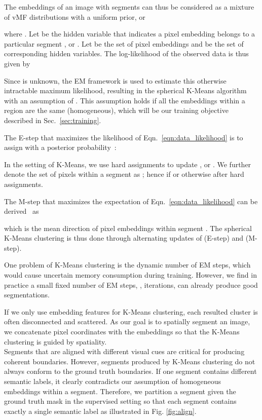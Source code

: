 \documentclass[10pt,twocolumn,letterpaper]{article}
\begin{document}
The embeddings of an image with  segments can thus be considered as a mixture of  vMF distributions with a uniform prior, or

where . Let  be the hidden variable that indicates a pixel embedding  belongs to a particular segment , or . Let  be the set of pixel embeddings and  be the set of corresponding hidden variables. The log-likelihood of the observed data is thus given by

Since  is unknown, the EM framework is used to estimate this otherwise intractable maximum likelihood, resulting in the spherical K-Means algorithm with an assumption of .  This assumption holds if all the embeddings within a region are the same (homogeneous), which will be our training objective described in Sec.~\ref{sec:training}.

The E-step that maximizes the likelihood of Eqn.~\ref{eqn:data_likelihood} is to assign  with a posterior probability~\cite{neal1998view}:

In the setting of K-Means, we use hard assignments to update , or . We further denote the set of pixels within a segment  as ; hence  if  or  otherwise after hard assignments.


The M-step that maximizes the expectation of Eqn.~\ref{eqn:data_likelihood} can be derived~\cite{banerjee2005clustering} as

which is the mean direction of pixel embeddings within segment .
The spherical K-Means clustering is thus done through alternating updates of  (E-step) and  (M-step).





One problem of K-Means clustering is the dynamic number of EM steps, which would cause uncertain memory consumption during training.
However, we find in practice a small fixed number of EM steps, \ie,  iterations, can already produce good segmentations.


If we only use embedding features for K-Means clustering, each resulted cluster is often disconnected and scattered.
As our goal is to spatially segment an image, we concatenate pixel coordinates with the embeddings so that the K-Means clustering is guided by spatiality. \\


 Segments that are aligned with different visual cues are critical for producing coherent boundaries. However, segments produced by K-Means clustering do not always conform to the ground truth boundaries.
If one segment contains different semantic labels, it clearly contradicts our assumption of homogeneous embeddings within a segment.
Therefore, we partition a segment given the ground truth mask in the supervised setting so that each segment contains exactly a single semantic label as illustrated in Fig. \ref{fig:align}.
\end{document}
